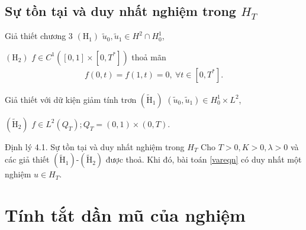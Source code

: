 \documentclass[9pt]{beamer}
\begin{document}
\subsection{Sự tồn tại và duy nhất nghiệm trong $H_T$}

\begin{frame}
    \begin{block}{Giả thiết chương 3}
    $(\text{H}_1)$ $\tilde{u}_0, \tilde{u}_1 \in H^2 \cap H^1_0$,

    $(\text{H}_2)$ $f \in C^1([0,1]\times[0,T^*])$ thoả mãn
    \begin{align*}
        f(0,t) = f(1,t) = 0, \ \forall t \in [0,T^*].
    \end{align*}
    \end{block}

    \begin{block}{Giả thiết với dữ kiện giảm tính trơn}
    $(\tilde{\text{H}}_1)$ $(\tilde{u}_0, \tilde{u}_1) \in H^1_0 \times L^2$,

    $(\tilde{\text{H}}_2)$ $f \in L^2(Q_T); Q_T = (0,1) \times (0, T)$.
    \end{block}

    \begin{block}{Định lý 4.1. Sự tồn tại và duy nhất nghiệm trong $H_T$}
    Cho $T > 0, K > 0, \lambda > 0$ và các giả thiết $(\tilde{\text{H}}_1)$-$(\tilde{\text{H}}_2)$ được thoả. Khi đó, bài toán \eqref{vareqn} có duy nhất một nghiệm $u \in H_T$.
    \end{block}
\end{frame}

\section{Tính tắt dần mũ của nghiệm}
\end{document}
